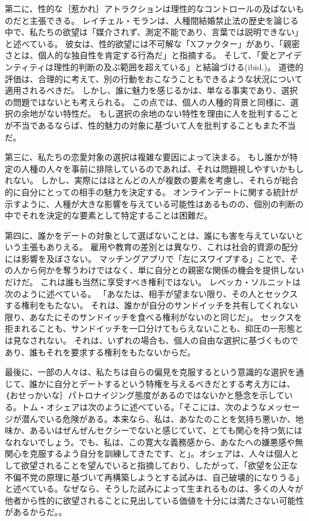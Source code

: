 \documentclass[paper=a4,book,openany]{jlreq}
\begin{document}
第二に、性的な｛惹かれ｝{アトラクション}は理性的なコントロールの及ばないものだと主張できる。
レイチェル・モランは、人種間結婚禁止法の歴史を論じる中で、私たちの欲望は「媒介されず、測定不能であり、言葉では説明できない」と述べている\citep[p.14]{moran01:_inter_intim}。
彼女は、性的欲望には不可解な「Xファクター」があり、「親密さとは、個人的な独自性を肯定する行為だ」と指摘する。
そして、「愛とアイデンティティは理性的判断の及ぶ範囲を超えている」と結論づける(ibid.)。
道徳的評価は、合理的に考えて、別の行動をおこなうこともできるような状況について適用されるべきだ。
しかし、誰に魅力を感じるかは、単なる事実であり、選択の問題ではないとも考えられる。
この点では、個人の人種的背景と同様に、選択の余地がない特性だ。
もし選択の余地のない特性を理由に人を批判することが不当であるならば、性的魅力の対象に基づいて人を批判することもまた不当だ。

第三に、私たちの恋愛対象の選択は複雑な要因によって決まる。
もし誰かが特定の人種の人々を事前に排除しているのであれば、それは問題視しやすいかもしれない。
しかし、実際にはほとんどの人が複数の要素を考慮し、それらが総合的に自分にとっての相手の魅力を決定する。
オンラインデートに関する統計が示すように、人種が大きな影響を与えている可能性はあるものの、個別の判断の中でそれを決定的な要素として特定することは困難だ。

第四に、誰かをデートの対象として選ばないことは、誰にも害を与えていないという主張もありえる。
雇用や教育の差別とは異なり、これは社会的資源の配分には影響を及ぼさない。
マッチングアプリで「左にスワイプする」ことで、その人から何かを奪うわけではなく、単に自分との親密な関係の機会を提供しないだけだ。
これは誰も当然に享受すべき権利ではない。
レベッカ・ソルニットは次のように述べている。
「あなたは、相手が望まない限り、その人とセックスする権利をもたない。
それは、誰かが自分のサンドイッチを共有してくれない限り、あなたにそのサンドイッチを食べる権利がないのと同じだ」\citep{solnit15:_men_explain_lolit_me}。
セックスを拒まれることも、サンドイッチを一口分けてもらえないことも、抑圧の一形態とは見なされない。
それは、いずれの場合も、個人の自由な選択に基づくものであり、誰もそれを要求する権利をもたないからだ。

最後に、一部の人々は、私たちは自らの偏見を克服するという意識的な選択を通じて、誰かに自分とデートするという特権を与えるべきだとする考え方には、｛おせっかいな｝{パトロナイジング}態度があるのではないかと懸念を示している。トム・オシェアは次のように述べている。「そこには、次のようなメッセージが潜んでいる危険がある。本来なら、私は、あなたのことを気持ち悪いか、地味か、あるいはぜんぜんセクシーでないと感じていて、とても関心を持つ気にはなれないでしょう。でも、私は、この寛大な義務感から、あなたへの嫌悪感や無関心を克服するよう自分を訓練してきたです、と」。オシェアは、人々は個人として欲望されることを望んでいると指摘しており、したがって、「欲望を公正な不偏不党の原理に基づいて再構築しようとする試みは、自己破壊的になりうる」と述べている。なぜなら、そうした試みによって生まれるものは、多くの人々が他者から性的に欲望されることに見出している価値を十分には満たさない可能性があるからだ\citep{oshea20:_sexual_desir_struc_injus}。。
\end{document}
